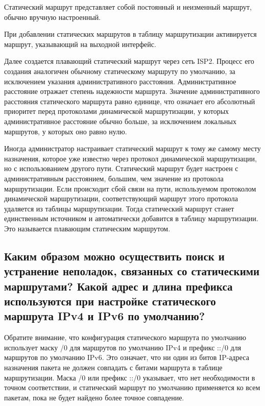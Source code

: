 Статический маршрут представляет собой постоянный и неизменный маршрут,
обычно вручную настроенный.\par
При добавлении статических маршрутов
в таблицу маршрутизации активируется маршрут,
указывающий на выходной интерфейс.\par
Далее создается плавающий статический маршрут через сеть ISP2.
Процесс его создания аналогичен обычному статическому маршруту по умолчанию,
за исключением указания административного расстояния.
Административное расстояние отражает степень надежности маршрута.
Значение административного расстояния статического маршрута равно единице,
что означает его абсолютный приоритет перед протоколами
динамической маршрутизации, у которых административное расстояние
обычно больше, за исключением локальных маршрутов,
у которых оно равно нулю.\par
Иногда администратор настраивает статический маршрут
к тому же самому месту назначения, которое уже известно
через протокол динамической маршрутизации, но с использованием другого пути.
Статический маршрут будет настроен с административным расстоянием, большим,
чем значение из протокола маршрутизации.
Если происходит сбой связи на пути, используемом протоколом динамической
маршрутизации, соответствующий маршрут этого протокола удаляется
из таблицы маршрутизации. Тогда статический маршрут станет единственным
источником и автоматически добавится в таблицу маршрутизации.
Это называется плавающим статическим маршрутом.

\subsection{Каким образом можно осуществить поиск и устранение неполадок,
	связанных со статическими маршрутами?
	Какой адрес и длина префикса используются при настройке
	статического маршрута IPv4 и IPv6 по умолчанию?}

Обратите внимание, что конфигурация статического маршрута
по умолчанию использует маску /0 для маршрутов по умолчанию IPv4
и префикс ::/0 для маршрутов по умолчанию IPv6.
Это означает, что ни один из битов IP-адреса назначения пакета
не должен совпадать с битами маршрута в таблице маршрутизации.
Маска /0 или префикс ::/0 указывает, что нет необходимости
в точном соответствии, и статический маршрут по умолчанию применяется
ко всем пакетам, пока не будет найдено более точное совпадение.

